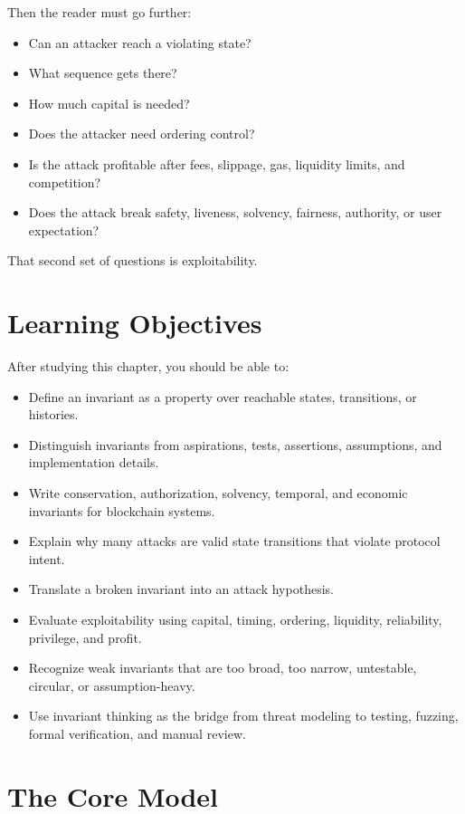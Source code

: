 Then the reader must go further:

\begin{itemize}
\tightlist
\item
  Can an attacker reach a violating state?
\item
  What sequence gets there?
\item
  How much capital is needed?
\item
  Does the attacker need ordering control?
\item
  Is the attack profitable after fees, slippage, gas, liquidity limits,
  and competition?
\item
  Does the attack break safety, liveness, solvency, fairness, authority,
  or user expectation?
\end{itemize}

That second set of questions is exploitability.

\section{Learning Objectives}

After studying this chapter, you should be able to:

\begin{itemize}
\tightlist
\item
  Define an invariant as a property over reachable states, transitions,
  or histories.
\item
  Distinguish invariants from aspirations, tests, assertions,
  assumptions, and implementation details.
\item
  Write conservation, authorization, solvency, temporal, and economic
  invariants for blockchain systems.
\item
  Explain why many attacks are valid state transitions that violate
  protocol intent.
\item
  Translate a broken invariant into an attack hypothesis.
\item
  Evaluate exploitability using capital, timing, ordering, liquidity,
  reliability, privilege, and profit.
\item
  Recognize weak invariants that are too broad, too narrow, untestable,
  circular, or assumption-heavy.
\item
  Use invariant thinking as the bridge from threat modeling to testing,
  fuzzing, formal verification, and manual review.
\end{itemize}

\section{The Core Model}

